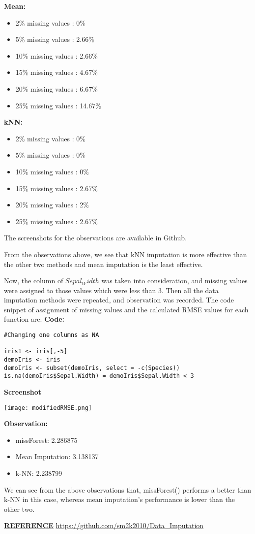 \documentclass{article}
\begin{document}
\textbf{Mean:}
\linebreak

\begin{itemize}
	\item 2\% missing values : 0\%
	\item 5\% missing values : 2.66\%
	\item 10\% missing values : 2.66\%
	\item 15\% missing values : 4.67\%
	\item 20\% missing values : 6.67\%
	\item 25\% missing values : 14.67\%
\end{itemize}

\textbf{kNN:}
\linebreak

\begin{itemize}
	\item 2\% missing values : 0\%
	\item 5\% missing values : 0\%
	\item 10\% missing values : 0\%
	\item 15\% missing values : 2.67\%
	\item 20\% missing values : 2\%
	\item 25\% missing values : 2.67\%
\end{itemize}

The screenshots for the observations are available in Github.

From the observations above, we see that kNN imputation is more effective than the other two methods and mean imputation is the least effective.

Now, the column of $Sepal_Width$ was taken into consideration, and missing values were assigned to those values which were less than 3. Then all the data imputation methods were repeated, and observation was recorded. The code snippet of assignment of missing values and the calculated RMSE values for each function are:
\textbf{Code:}
\begin{lstlisting}
#Changing one columns as NA

iris1 <- iris[,-5]
demoIris <- iris
demoIris <- subset(demoIris, select = -c(Species))
is.na(demoIris$Sepal.Width) = demoIris$Sepal.Width < 3
\end{lstlisting}
\textbf{Screenshot}
\begin{center}
	\texttt{[image: modifiedRMSE.png]}
\end{center}
\textbf{Observation:}
\begin{itemize}
	\item missForest: 2.286875
	\item Mean Imputation: 3.138137
	\item k-NN: 2.238799
\end{itemize}
We can see from the above observations that, missForest() performs a better than k-NN in this case, whereas mean imputation's performance is lower than the other two. \linebreak
    
    \underline{\textbf{REFERENCE}}
    \linebreak
	\url{https://github.com/sm2k2010/Data_Imputation}
	
\end{document}
